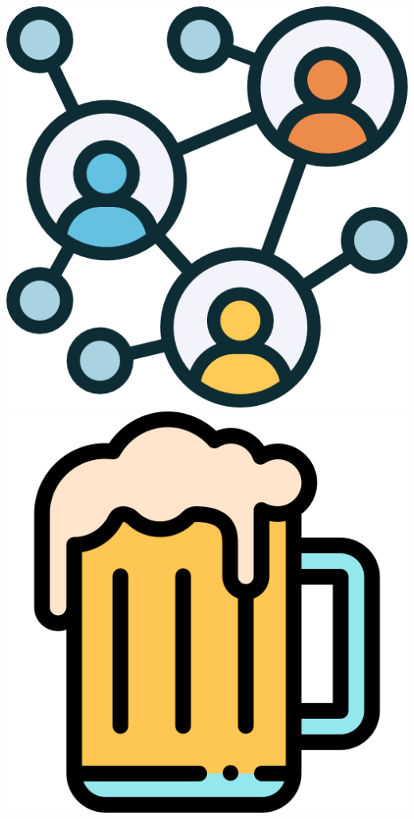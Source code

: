 \begin{tcolorbox}
\begin{spacing}{1.2}
\begin{multicols}{2}
\begin{center}
                \hfill
                \includegraphics[scale=0.055]{figs/networking.png}
                \hfill
                \includegraphics[scale=0.055]{figs/beer.png}

\end{center}
\end{multicols}
\end{spacing}
\end{tcolorbox}
